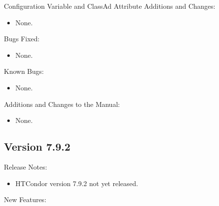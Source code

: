 \noindent Configuration Variable and ClassAd Attribute Additions and Changes:

\begin{itemize}

\item None.

\end{itemize}

\noindent Bugs Fixed:

\begin{itemize}

\item None.

\end{itemize}

\noindent Known Bugs:

\begin{itemize}

\item None.

\end{itemize}

\noindent Additions and Changes to the Manual:

\begin{itemize}

\item None.

\end{itemize}


\subsection*{\label{sec:New-7-9-2}Version 7.9.2}

\noindent Release Notes:

\begin{itemize}

\item HTCondor version 7.9.2 not yet released.

\end{itemize}


\noindent New Features:

